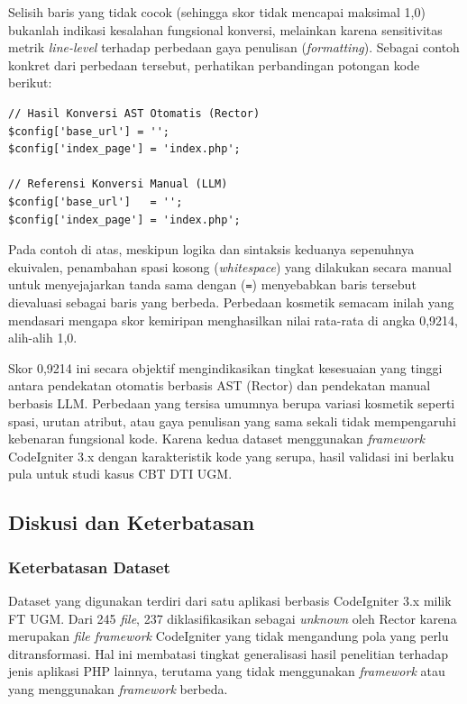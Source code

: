 Selisih baris yang tidak cocok (sehingga skor tidak mencapai maksimal 1,0) bukanlah indikasi kesalahan fungsional konversi, melainkan karena sensitivitas metrik \textit{line-level} terhadap perbedaan gaya penulisan (\textit{formatting}). Sebagai contoh konkret dari perbedaan tersebut, perhatikan perbandingan potongan kode berikut:

\begin{minipage}{\linewidth}
\begin{lstlisting}[style=promptstyle]
// Hasil Konversi AST Otomatis (Rector)
$config['base_url'] = '';
$config['index_page'] = 'index.php';

// Referensi Konversi Manual (LLM)
$config['base_url']   = '';
$config['index_page'] = 'index.php';
\end{lstlisting}
\end{minipage}
\vspace{1em}

Pada contoh di atas, meskipun logika dan sintaksis keduanya sepenuhnya ekuivalen, penambahan spasi kosong (\textit{whitespace}) yang dilakukan secara manual untuk menyejajarkan tanda sama dengan (\texttt{=}) menyebabkan baris tersebut dievaluasi sebagai baris yang berbeda. Perbedaan kosmetik semacam inilah yang mendasari mengapa skor kemiripan menghasilkan nilai rata-rata di angka 0,9214, alih-alih 1,0.

Skor 0,9214 ini secara objektif mengindikasikan tingkat kesesuaian yang tinggi antara pendekatan otomatis berbasis AST (Rector) dan pendekatan manual berbasis LLM. Perbedaan yang tersisa umumnya berupa variasi kosmetik seperti spasi, urutan atribut, atau gaya penulisan yang sama sekali tidak mempengaruhi kebenaran fungsional kode. Karena kedua dataset menggunakan \textit{framework} CodeIgniter 3.x dengan karakteristik kode yang serupa, hasil validasi ini berlaku pula untuk studi kasus CBT DTI UGM.

\subsection{Diskusi dan Keterbatasan}

\subsubsection{Keterbatasan Dataset}

Dataset yang digunakan terdiri dari satu aplikasi berbasis CodeIgniter 3.x milik FT UGM. Dari 245 \textit{file}, 237 diklasifikasikan sebagai \textit{unknown} oleh Rector karena merupakan \textit{file framework} CodeIgniter yang tidak mengandung pola yang perlu ditransformasi. Hal ini membatasi tingkat generalisasi hasil penelitian terhadap jenis aplikasi PHP lainnya, terutama yang tidak menggunakan \textit{framework} atau yang menggunakan \textit{framework} berbeda.

